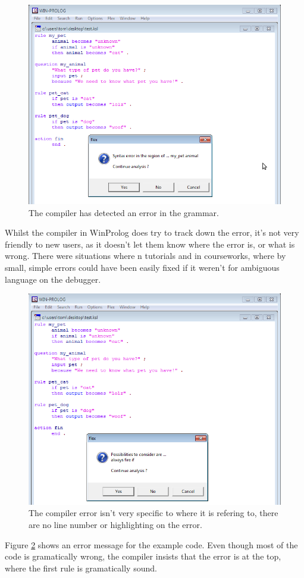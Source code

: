 \documentclass[12pt]{report}
\begin{document}
\begin{figure}[H]
	\centering
		\includegraphics[scale=0.65]{flex_error1}
		\caption{The compiler has detected an error in the grammar.}\label{fig:flex_error1}
\end{figure}
Whilst the compiler in WinProlog does try to track down the error, it's not very friendly to new users, as it doesn't let them know where the error is, or what is wrong.  There were situations where n tutorials and in courseworks, where by small, simple errors could have been easily fixed if it weren't for ambiguous language on the debugger.
\begin{figure}[H]
	\centering
		\includegraphics[scale=0.65]{flex_error2}
		\caption{The compiler error isn't very specific to where it is refering to, there are no line number or highlighting on the error.}\label{fig:flex_error2}
\end{figure}
Figure \ref{fig:flex_error2} shows an error message for the example code.  Even though most of the code is gramatically wrong, the compiler insists that the error is at the top, where the first rule is gramatically sound.
\clearpage
\end{document}
